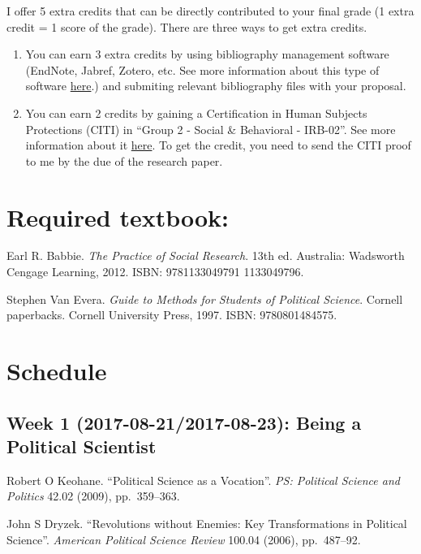 \documentclass[11pt,]{article}
\theoremstyle{definition}
\theoremstyle{definition}
\theoremstyle{remark}
\begin{document}
I offer 5 extra credits that can be directly contributed to your final
grade (1 extra credit = 1 score of the grade). There are three ways to
get extra credits.

\begin{enumerate}
\def\labelenumi{\arabic{enumi}.}
\item
  You can earn 3 extra credits by using bibliography management software
  (EndNote, Jabref, Zotero, etc. See more information about this type of
  software
  \href{https://en.wikipedia.org/wiki/Comparison_of_reference_management_software}{here}.)
  and submiting relevant bibliography files with your proposal.
\item
  You can earn 2 credits by gaining a Certification in Human Subjects
  Protections (CITI) in ``Group 2 - Social \& Behavioral - IRB-02''. See
  more information about it
  \href{https://hso.research.uiowa.edu/certifications-human-subjects-protections-citi}{here}.
  To get the credit, you need to send the CITI proof to me by the due of
  the research paper.
\end{enumerate}

\section{Required textbook:}\label{required-textbook}

Earl R. Babbie. \emph{The Practice of Social Research}. 13th ed.
Australia: Wadsworth Cengage Learning, 2012. ISBN: 9781133049791
1133049796.

Stephen Van Evera.
\emph{Guide to Methods for Students of Political Science}. Cornell
paperbacks. Cornell University Press, 1997. ISBN: 9780801484575.

\section{Schedule}\label{schedule}

\subsection{Week 1 (2017-08-21/2017-08-23): Being a Political
Scientist}\label{week-1-2017-08-212017-08-23-being-a-political-scientist}

Robert O Keohane. ``Political Science as a Vocation''.
\emph{PS: Political Science and Politics} 42.02 (2009), pp.~359--363.

John S Dryzek. ``Revolutions without Enemies: Key Transformations in
Political Science''. \emph{American Political Science Review} 100.04
(2006), pp.~487--92.
\end{document}
